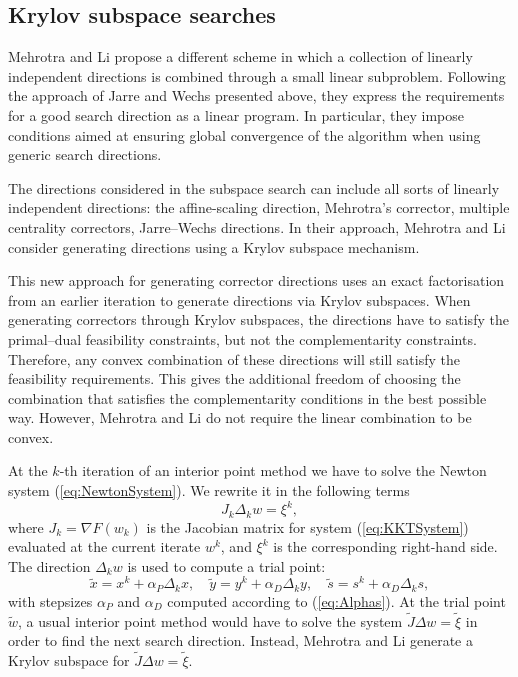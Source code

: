 %
%
\subsection{Krylov subspace searches}
\label{sec:MehrotraLi}

Mehrotra and Li \cite{MehrotraLi} propose a different 
scheme in which a collection of linearly 
independent directions is combined through a small linear subproblem.
Following the approach of Jarre and Wechs \cite{JarreWechs}
presented above,
they express the requirements for a good search direction as a linear 
program. In particular, they impose conditions aimed at ensuring 
global convergence of the algorithm when using generic search directions.

The directions considered in the subspace search can include all 
sorts of linearly independent directions: the affine-scaling direction, 
Mehrotra's corrector, multiple centrality correctors, Jarre--Wechs 
directions. 
In their approach, Mehrotra and Li \cite{MehrotraLi}
consider generating directions using a Krylov subspace mechanism.

This new approach for generating corrector directions uses an exact 
factorisation from an earlier iteration to generate directions 
via Krylov subspaces. 
When generating correctors through Krylov subspaces, the directions 
have to satisfy the primal--dual feasibility constraints, but not 
the complementarity constraints. Therefore, any convex combination 
of these directions will still satisfy the feasibility requirements.
This gives the additional freedom of choosing the combination that 
satisfies the complementarity conditions in the best possible way. 
However, Mehrotra and Li \cite{MehrotraLi} do not require 
the linear combination to be convex.

At the $k$-th iteration of an interior point method we have to solve 
the Newton system (\ref{eq:NewtonSystem}).
We rewrite it in the following terms
\[
   J_k \Delta_k w = \xi^k, 
\]
where 
$J_k = \nabla F(w_k)$ is the Jacobian matrix for system
(\ref{eq:KKTSystem}) evaluated at the current iterate $w^k$,
and $\xi^k$ is the corresponding right-hand side.
%
The direction $\Delta_k w$ is used to compute a trial point:
\[
\tilde{x} = x^k + \alpha_P \Delta_k x, \quad
\tilde{y} = y^k + \alpha_D \Delta_k y, \quad
\tilde{s} = s^k + \alpha_D \Delta_k s,
\]
with stepsizes $\alpha_P$ and $\alpha_D$ computed according
to (\ref{eq:Alphas}).
At the trial point $\tilde w$, a usual 
interior point method would have to solve the system
$\tilde J \Delta w = \tilde \xi$
in order to find the next search direction. Instead, 
Mehrotra and Li \cite{MehrotraLi} generate a Krylov subspace 
for $\tilde J \Delta w = \tilde \xi$.


